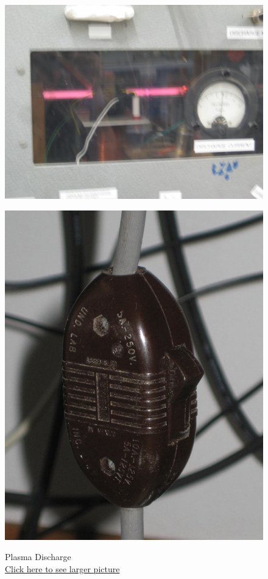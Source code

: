 \documentclass{../lab}
\begin{document}
\begin{figure}[!htb]
  \href{http://experimentationlab.berkeley.edu/sites/default/files/images/HAL_Plasma_3570.jpg}{\includegraphics[width=\linewidth,keepaspectratio]{images/HAL_Plasma_3570.jpg}}
  \caption{Plasma Discharge \\ \href{http://experimentationlab.berkeley.edu/sites/default/files/images/HAL_Plasma_3570.jpg}{Click here to see larger picture}}\label{fig:HAL_Plasma_3570.jpg}
\endminipage\hfill
{}
  \href{http://experimentationlab.berkeley.edu/sites/default/files/images/Pump_Switch_3535-Lg.jpg}{\includegraphics[width=\linewidth,keepaspectratio]{images/Pump_Switch_3535-Lg.jpg}}

\end{figure}
\end{document}
